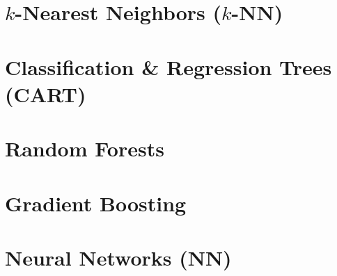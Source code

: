 \section{$k$-Nearest Neighbors ($k$-NN)}


\section{Classification \& Regression Trees (CART)}


\section{Random Forests}


\section{Gradient Boosting}


\section{Neural Networks (NN)}


\endlecture

